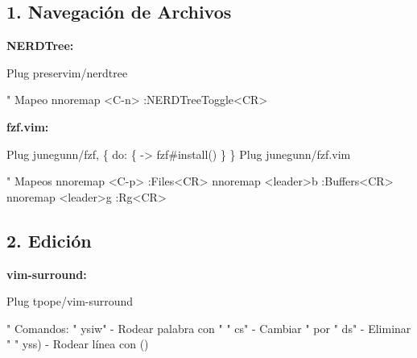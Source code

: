 \documentclass[
  doc,
  floatsintext,
  longtable,
  a4paper,
  nolmodern,
  notxfonts,
  notimes,
  12pt,
  colorlinks=true,linkcolor=blue,citecolor=blue,urlcolor=blue]{apa7}
\newenvironment{Shaded}{\begin{snugshade}}{\end{snugshade}}
\newcommand{\NormalTok}[1]{\textcolor[rgb]{0.00,0.23,0.31}{#1}}
\begin{document}
\subsection{1. Navegación de Archivos}\label{navegaciuxf3n-de-archivos}

\textbf{NERDTree:}

\begin{Shaded}
\begin{Highlighting}[]
\NormalTok{Plug \textquotesingle{}preservim/nerdtree\textquotesingle{}}

\NormalTok{" Mapeo}
\NormalTok{nnoremap \textless{}C{-}n\textgreater{} :NERDTreeToggle\textless{}CR\textgreater{}}
\end{Highlighting}
\end{Shaded}

\textbf{fzf.vim:}

\begin{Shaded}
\begin{Highlighting}[]
\NormalTok{Plug \textquotesingle{}junegunn/fzf\textquotesingle{}, \{ \textquotesingle{}do\textquotesingle{}: \{ {-}\textgreater{} fzf\#install() \} \}}
\NormalTok{Plug \textquotesingle{}junegunn/fzf.vim\textquotesingle{}}

\NormalTok{" Mapeos}
\NormalTok{nnoremap \textless{}C{-}p\textgreater{} :Files\textless{}CR\textgreater{}}
\NormalTok{nnoremap \textless{}leader\textgreater{}b :Buffers\textless{}CR\textgreater{}}
\NormalTok{nnoremap \textless{}leader\textgreater{}g :Rg\textless{}CR\textgreater{}}
\end{Highlighting}
\end{Shaded}

\subsection{2. Edición}\label{ediciuxf3n}

\textbf{vim-surround:}

\begin{Shaded}
\begin{Highlighting}[]
\NormalTok{Plug \textquotesingle{}tpope/vim{-}surround\textquotesingle{}}

\NormalTok{" Comandos:}
\NormalTok{" ysiw" {-} Rodear palabra con "}
\NormalTok{" cs"\textquotesingle{} {-} Cambiar " por \textquotesingle{}}
\NormalTok{" ds" {-} Eliminar "}
\NormalTok{" yss) {-} Rodear línea con ()}
\end{Highlighting}
\end{Shaded}
\end{document}
